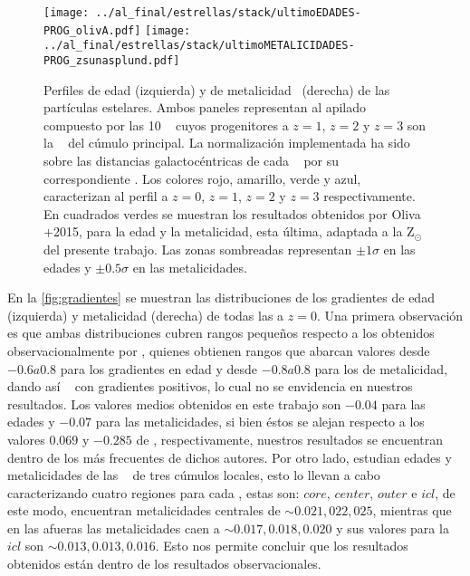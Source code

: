 \begin{figure}[H]
 \texttt{[image: ../al\_final/estrellas/stack/ultimoEDADES-PROG\_olivA.pdf]}
 \texttt{[image: ../al\_final/estrellas/stack/ultimoMETALICIDADES-PROG\_zsunasplund.pdf]}
\caption{Perfiles de edad (izquierda) y de metalicidad\protect\footnotemark~ (derecha) de las part\'iculas estelares.
Ambos paneles representan al apilado compuesto por las 10 \bcgs~ cuyos progenitores a $z=1$, $z=2$ y $z=3$ son la \bcg~ del c\'umulo principal.
La normalizaci\'on implementada ha sido sobre las distancias galactoc\'entricas de cada \bcg~ por su correspondiente \rvc.
Los colores rojo, amarillo, verde y azul, caracterizan al perfil
a $z=0$, $z=1$, $z=2$ y $z=3$ respectivamente. En cuadrados verdes se muestran los resultados obtenidos por Oliva$+$2015,
para la edad y la metalicidad, esta \'ultima, adaptada a la Z$_{\odot}$ del presente trabajo.
Las zonas sombreadas representan $\pm 1\sigma$ en las edades y $\pm 0.5\sigma$ en las metalicidades.}
\label{fig:edad}
\end{figure}


En la \ref{fig:gradientes} se muestran las distribuciones de los gradientes
de edad (izquierda) y metalicidad (derecha) de todas las \bcgs a $z=0$. Una primera observaci\'on es que ambas 
distribuciones cubren rangos peque\~nos 
respecto a los obtenidos observacionalmente por \cite{lou12}, quienes obtienen
rangos que abarcan valores desde  $-0.6 a 0.8$ para los gradientes
en edad y desde $-0.8 a 0.8$ para los de metalicidad, dando as\'i
\bcgs~ con gradientes positivos, lo cual no se envidencia en nuestros resultados.
Los valores medios obtenidos en este trabajo son $-0.04$ para las edades
y $-0.07$ para las metalicidades, si bien \'estos se alejan respecto a los valores $0.069$ y $-0.285$ de \cite{lou12},
respectivamente, nuestros resultados se encuentran dentro de los m\'as frecuentes de dichos autores.
Por otro lado, \cite{edw16} estudian edades y metalicidades de las \bcgs~ de tres c\'umulos locales,
esto lo llevan a cabo caracterizando cuatro regiones para cada \bcg, estas son: $core$, $center$, $outer$ e $icl$,
de este modo, encuentran metalicidades centrales
de $\sim 0.021, 022, 025$, mientras que en las afueras 
las metalicidades caen a $\sim 0.017, 0.018, 0.020$ y sus valores para la $icl$ son $\sim 0.013, 0.013, 0.016$. Esto
nos permite concluir que los resultados obtenidos est\'an dentro de los resultados observacionales.



